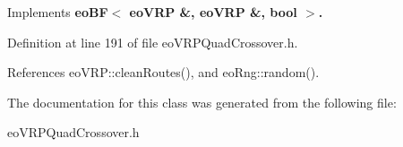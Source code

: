 Implements \bf{eo\-BF$<$ eo\-VRP \&, eo\-VRP \&, bool $>$}.

Definition at line 191 of file eo\-VRPQuad\-Crossover.h.

References eo\-VRP::clean\-Routes(), and eo\-Rng::random().

The documentation for this class was generated from the following file:\begin{CompactItemize}
\item 
eo\-VRPQuad\-Crossover.h\end{CompactItemize}
